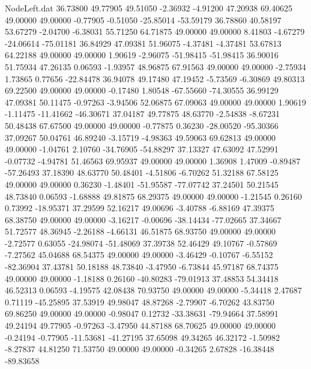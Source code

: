 \begin{filecontents}{NodeLeft.dat}
  36.73800   49.77905   49.51050    -2.36932   -4.91200   47.20938   69.40625   49.00000   49.00000   -0.77905   -0.51050  -25.85014  -53.59179
  36.78860   40.58197   53.67279    -2.04700   -6.38031   55.71250   64.71875   49.00000   49.00000    8.41803   -4.67279  -24.06614  -75.01181
  36.84929   47.09381   51.96075    -4.37481   -4.37481   53.67813   64.22188   49.00000   49.00000    1.90619   -2.96075  -51.98415  -51.98415
  36.90016   51.75934   47.26135     0.06593   -1.93957   48.96875   67.91563   49.00000   49.00000   -2.75934    1.73865    0.77656  -22.84478
  36.94078   49.17480   47.19452    -5.73569   -6.30869   49.80313   69.22500   49.00000   49.00000   -0.17480    1.80548  -67.55660  -74.30555
  36.99129   47.09381   50.11475    -0.97263   -3.94506   52.06875   67.09063   49.00000   49.00000    1.90619   -1.11475  -11.41662  -46.30671
  37.04187   49.77875   48.63770    -2.54838   -8.67231   50.48438   67.67500   49.00000   49.00000   -0.77875    0.36230  -28.00520  -95.30366
  37.09267   50.04761   46.89240    -3.15719   -4.98363   49.59063   69.62813   49.00000   49.00000   -1.04761    2.10760  -34.76905  -54.88297
  37.13327   47.63092   47.52991    -0.07732   -4.94781   51.46563   69.95937   49.00000   49.00000    1.36908    1.47009   -0.89487  -57.26493
  37.18390   48.63770   50.48401    -4.51806   -6.70262   51.32188   67.58125   49.00000   49.00000    0.36230   -1.48401  -51.95587  -77.07742
  37.24501   50.21545   48.73840     0.06593   -1.68888   49.81875   68.29375   49.00000   49.00000   -1.21545    0.26160    0.73992  -18.95371
  37.29599   52.16217   49.00696    -3.40788   -6.88169   47.39375   68.38750   49.00000   49.00000   -3.16217   -0.00696  -38.14434  -77.02665
  37.34667   51.72577   48.36945    -2.26188   -4.66131   46.51875   68.93750   49.00000   49.00000   -2.72577    0.63055  -24.98074  -51.48069
  37.39738   52.46429   49.10767    -0.57869   -7.27562   45.04688   68.54375   49.00000   49.00000   -3.46429   -0.10767   -6.55152  -82.36904
  37.43781   50.18188   48.73840    -3.47950   -6.73844   45.97187   68.74375   49.00000   49.00000   -1.18188    0.26160  -40.80283  -79.01913
  37.48853   54.34418   46.52313     0.06593   -4.19575   42.08438   70.93750   49.00000   49.00000   -5.34418    2.47687    0.71119  -45.25895
  37.53919   49.98047   48.87268    -2.79907   -6.70262   43.83750   69.86250   49.00000   49.00000   -0.98047    0.12732  -33.38631  -79.94664
  37.58991   49.24194   49.77905    -0.97263   -3.47950   44.87188   68.70625   49.00000   49.00000   -0.24194   -0.77905  -11.53681  -41.27195
  37.65098   49.34265   46.32172    -1.50982   -8.27837   44.81250   71.53750   49.00000   49.00000   -0.34265    2.67828  -16.38448  -89.83658

\end{filecontents}
